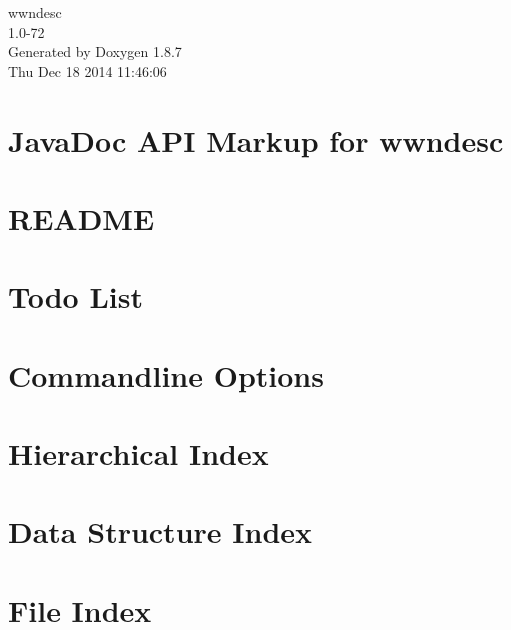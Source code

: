 \documentclass[twoside]{book}
\newcommand{\+}{\discretionary{\mbox{\scriptsize$\hookleftarrow$}}{}{}}
\newcommand{\clearemptydoublepage}{%
  \newpage{\pagestyle{empty}\cleardoublepage}%
}
\begin{document}
\begin{titlepage}
\vspace*{7cm}
\begin{center}%
{\Large wwndesc \\[1ex]\large 1.\+0-\/72 }\\
\vspace*{1cm}
{\large Generated by Doxygen 1.8.7}\\
\vspace*{0.5cm}
{\small Thu Dec 18 2014 11:46:06}\\
\end{center}
\end{titlepage}
\clearemptydoublepage
\tableofcontents
\clearemptydoublepage
{}

\chapter{Java\+Doc A\+P\+I Markup for wwndesc}
\label{index}
\chapter{R\+E\+A\+D\+M\+E}
\label{md_htdocs_README}

\chapter{Todo List}
\label{todo}

\chapter{Commandline Options}
\label{cmdopt}

\chapter{Hierarchical Index}

\chapter{Data Structure Index}

\chapter{File Index}

\end{document}

